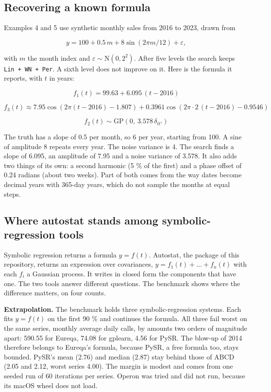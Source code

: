 \documentclass[
]{article}
\begin{document}
\subsection{Recovering a known
formula}\label{recovering-a-known-formula}

Examples 4 and 5 use synthetic monthly sales from 2016 to 2023, drawn
from

\[y = 100 + 0.5\,m + 8\sin(2\pi m/12) + \varepsilon,\]

with \(m\) the month index and \(\varepsilon \sim \mathrm{N}(0, 2^2)\).
After five levels the search keeps \texttt{Lin\ +\ WN\ +\ Per}. A sixth
level does not improve on it. Here is the formula it reports, with \(t\)
in years:

\[f_1(t) = 99.63 + 6.095\,(t - 2016)\]

\[f_3(t) \approx 7.95\cos\left(2\pi (t - 2016) - 1.807\right) + 0.3961\cos\left(2\pi \cdot 2\,(t - 2016) - 0.9546\right)\]

\[f_2(t) \sim \mathrm{GP}\left(0,\ 3.578\,\delta_{t t'}\right)\]

The truth has a slope of 0.5 per month, so 6 per year, starting from
100. A sine of amplitude 8 repeats every year. The noise variance is 4.
The search finds a slope of 6.095, an amplitude of 7.95 and a noise
variance of 3.578. It also adds two things of its own: a second harmonic
(5 \% of the first) and a phase offset of 0.24 radians (about two
weeks). Part of both comes from the way dates become decimal years with
365-day years, which do not sample the months at equal steps.

\subsection{Where autostat stands among symbolic-regression
tools}\label{where-autostat-stands-among-symbolic-regression-tools}

Symbolic regression returns a formula \(y = f(t)\). Autostat, the
package of this repository, returns an expression over covariances,
\(y = f_1(t) + \dots + f_n(t)\) with each \(f_i\) a Gaussian process. It
writes in closed form the components that have one. The two tools answer
different questions. The benchmark shows where the difference matters,
on four counts.

\textbf{Extrapolation.} The benchmark holds three symbolic-regression
systems. Each fits \(y = f(t)\) on the first 90 \% and continues the
formula. All three fail worst on the same series, monthly average daily
calls, by amounts two orders of magnitude apart: 590.55 for Eureqa,
74.08 for gplearn, 4.56 for PySR. The blow-up of 2014 therefore belongs
to Eureqa's formula, because PySR, a free formula too, stays bounded.
PySR's mean (2.76) and median (2.87) stay behind those of ABCD (2.05 and
2.12, worst series 4.00). The margin is modest and comes from one seeded
run of 60 iterations per series. Operon \autocite{burlacu2020operon} was
tried and did not run, because its macOS wheel does not load.
\end{document}

